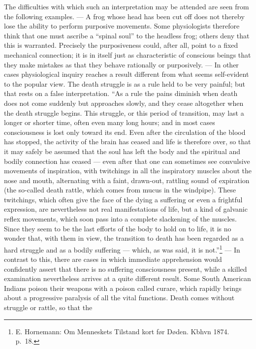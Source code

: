 \documentclass[12pt,a4paper]{book}
\newcommand{\opage}[1]{\marginnote{\footnotesize\textit{[#1]}}}
\begin{document}
The difficulties with which such an interpretation may be attended are
seen from the following examples. --- A frog whose head has been cut off
does not thereby lose the ability to perform purposive movements. Some
physiologists therefore think that one must ascribe a ``spinal soul'' to
the headless frog; others deny that this is warranted. Precisely the
purposiveness
\opage{12}could, after all, point to a fixed mechanical connection; it is
in itself just as characteristic of conscious beings that they make
mistakes as that they behave rationally or purposively. --- In other
cases physiological inquiry reaches a result different from what seems
self-evident to the popular view. The death struggle is as a rule held to
be very painful; but that rests on a false interpretation. ``As a rule
the pains diminish when death does not come suddenly but approaches
slowly, and they cease altogether when the death struggle begins. This
struggle, or this period of transition, may last a longer or shorter
time, often even many long hours; and in most cases consciousness is lost
only toward its end. Even after the circulation of the blood has
stopped, the activity of the brain has ceased and life is therefore
over, so that it may safely be assumed that the soul has left the body
and the spiritual and bodily connection has ceased --- even after that
one can sometimes see convulsive movements of inspiration, with
twitchings in all the inspiratory muscles about the nose and mouth,
alternating with a faint, drawn-out, rattling sound of expiration (the
so-called death rattle, which comes from mucus in the windpipe). These
twitchings, which often give the face of the dying a suffering or even a
frightful expression, are nevertheless not real manifestations of life,
but a kind of galvanic reflex movements, which soon pass into a complete
slackening of the muscles. Since they seem to be the last efforts of the
body to hold on to life, it is no wonder that, with them in view, the
transition to death has been regarded as a hard struggle and as a bodily
suffering --- which, as was said, it is not.''\footnote{E. Hornemann: Om
Menneskets Tilstand kort før Døden. Kbhvn 1874. p.~18.} --- In contrast
to this, there are cases in which immediate apprehension would
confidently assert that there is no suffering consciousness present,
while a skilled examination nevertheless arrives at a quite different
result. Some South American Indians poison their weapons with a poison
called curare, which rapidly brings about a progressive paralysis of all
the vital functions. Death comes without struggle or rattle, so that the
\end{document}
